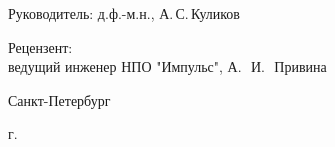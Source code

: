 \begin{titlepage}
\begin{center}
\begin{flushright}
\begin{minipage}{0.87\textwidth}
		\vspace{5mm} %
		
		{Руководитель:} д.ф.-м.н., А.\,С.\,Куликов \hfill  \underline{\hspace{3.7cm}}
		
		\vspace{10mm} %
		
		{Рецензент:} \\
		ведущий инженер НПО "Импульс", А.\,~И.\,~Привина
	\end{minipage}
\end{flushright}



\vfill

{Санкт-Петербург}
\par{\the\year{} г.}
\end{center}
\end{titlepage}
\restoregeometry
\addtocounter{page}{1}

